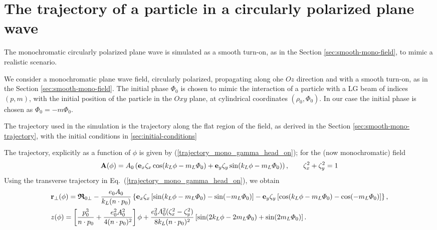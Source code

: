 
\section{The trajectory of a particle in a circularly polarized plane wave}

The monochromatic circularly polarized plane wave is simulated as a smooth turn-on, as in the Section \ref{sec:smooth-mono-field}, to mimic a realistic scenario.

We consider a monochromatic plane  wave field, circularly polarized, propagating along ohe $Oz$ direction and with a smooth turn-on, as in the Section \ref{sec:smooth-mono-field}. The initial phase $\Phi_0$ is chosen to mimic the interaction of a particle with a LG beam of indices $(p,m)$, with the initial position of the particle in the $Oxy$ plane, at cylindrical coordinates $(\rho_0,\varPhi_0)$. In our case the initial phase is chosen as $\Phi_0=-m\varPhi_0$.

The trajectory used in the simulation is the trajectory along the flat region of the field, as derived in the Section \ref{sec:smooth-mono-trajectory}, with the initial conditions in \ref{sec:initial-conditions}

The trajectory, explicitly as a function of $\phi$ is given by (\ref{trajectory_mono_gamma_head_on}); for the (now monochromatic) field
\begin{align}
  {\bf A}(\phi)=A_0\left({\bf e}_x\zeta_x\cos(k_L\phi-m_L\varPhi_0)+{\bf e}_y\zeta_y\sin(k_L\phi-m_L\varPhi_0)\right), \qquad \zeta_x^2+\zeta_y^2=1
\end{align}
Using the transverse trajectory in Eq.~(\ref{trajectory_mono_gamma_head_on}), we obtain
\begin{align}
  & {\bf r}_{\perp}(\phi)= {\boldsymbol{\mathfrak R}}_{0\perp}-\frac{e_0 A_0}{k_L(n\cdot p_0)}
  \left\{
    {\bf e}_x\zeta_x\left[\sin(k_L\phi-m_L\varPhi_0)-\sin(-m_L\varPhi_0)\right]
    -{\bf e}_y\zeta_y\left[\cos(k_L\phi-m_L\varPhi_0)-\cos(-m_L\varPhi_0)\right]
  \right\},\nonumber       \\
  & z(\phi)=\left[\frac{p_0^3}{n\cdot p_0}+\frac{e_0^2A_0^2}{4(n\cdot p_0)^2}\right]\phi+\frac{e_0^2A_0^2(\zeta_x^2-\zeta_y^2)}{8k_L(n\cdot p_0)^2}
  \left[\sin(2k_L\phi-2m_L\varPhi_0)+\sin(2m_L\varPhi_0)\right].
\end{align}


